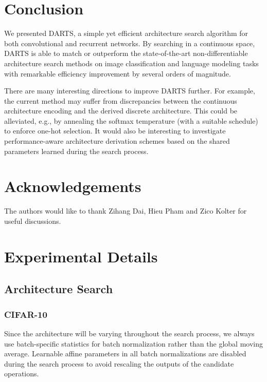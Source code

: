 \documentclass{article}
\begin{document}
 \section{Conclusion}
We presented DARTS,
a simple yet efficient architecture search algorithm
for both convolutional and recurrent networks.
By searching in a continuous space,
DARTS is able to match or outperform the state-of-the-art 
non-differentiable architecture search methods on image classification and language modeling tasks with remarkable efficiency improvement by several orders of magnitude.

There are many interesting directions to improve DARTS further.
For example,
the current method may suffer from discrepancies between the continuous architecture encoding and the derived discrete architecture.
This could be alleviated, e.g., by annealing the softmax temperature (with a suitable schedule) to enforce one-hot selection.
It would also be interesting to investigate performance-aware architecture derivation schemes based on the shared parameters learned during the search process.

 \section*{Acknowledgements}
 The authors would like to thank Zihang Dai, Hieu Pham and Zico Kolter for useful discussions.




\newpage
\appendix

\section{Experimental Details}
\subsection{Architecture Search}
\subsubsection{CIFAR-10}
\label{sec:search-cifar10}
Since the architecture will be varying throughout the search process,
we always use batch-specific statistics for batch normalization rather than the global moving average.
Learnable affine parameters in all batch normalizations are disabled during the search process to avoid rescaling the outputs of the candidate operations.
\end{document}

